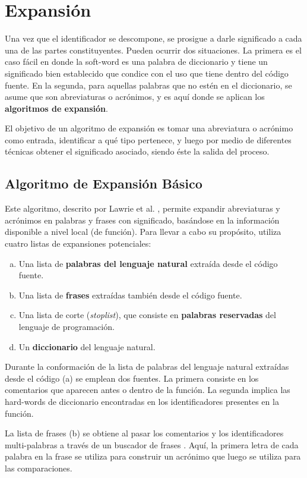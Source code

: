 \section{Expansión}
Una vez que el identificador se descompone, se prosigue a darle significado a cada una de las partes constituyentes.
Pueden ocurrir dos situaciones.
La primera es el caso fácil en donde la soft-word es una palabra de diccionario y tiene un significado bien establecido que condice con el uso que tiene dentro del código fuente.
En la segunda, para aquellas palabras que no estén en el diccionario, se asume que son abreviaturas o acrónimos, y es aquí donde se aplican los \textbf{algoritmos de expansión}.

El objetivo de un algoritmo de expansión es tomar una abreviatura o acrónimo como entrada, identificar a qué tipo pertenece, y luego por medio de diferentes técnicas obtener el significado asociado, siendo éste la salida del proceso.

\subsection{Algoritmo de Expansión Básico}
Este algoritmo, descrito por Lawrie et al. \cite{Lawrie:2007:EMA:1306878.1307350}, permite expandir abreviaturas y acrónimos en palabras y frases con significado, basándose en la información disponible a nivel local (de función).
Para llevar a cabo su propósito, utiliza cuatro listas de expansiones potenciales:
\begin{enumerate}[(a)]
  \item Una lista de \textbf{palabras del lenguaje natural} extraída desde el código fuente.
  \item Una lista de \textbf{frases} extraídas también desde el código fuente.
  \item Una lista de corte (\textit{stoplist}), que consiste en \textbf{palabras reservadas} del lenguaje de programación.
  \item Un \textbf{diccionario} del lenguaje natural.
\end{enumerate}

Durante la conformación de la lista de palabras del lenguaje natural extraídas desde el código (a) se emplean dos fuentes.
La primera consiste en los comentarios que aparecen antes o dentro de la función.
La segunda implica las hard-words de diccionario encontradas en los identificadores presentes en la función.

La lista de frases (b) se obtiene al pasar los comentarios y los identificadores multi-palabras a través de un buscador de frases \cite{Feng01}.
Aquí, la primera letra de cada palabra en la frase se utiliza para construir un acrónimo que luego se utiliza para las comparaciones.

